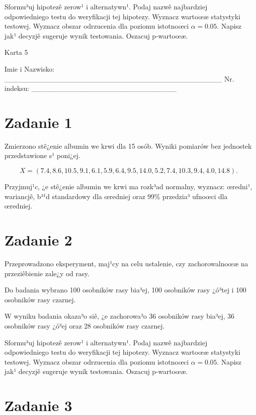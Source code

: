 \documentclass[a4paper,12pt]{article}
\begin{document}
     Sformu³uj hipotezê zerow¹ i alternatywn¹. 
     Podaj nazwê najbardziej odpowiedniego testu do weryfikacji tej hipotezy. 
     Wyznacz wartoœæ statystyki testowej. 
     Wyznacz obszar odrzucenia dla poziomu istotnoœci $\alpha=0.05$. 
     Napisz jak¹ decyzjê sugeruje wynik testowania. 
     Oszacuj p-wartoœæ. \vspace{1cm} 

  \clearpage  Karta  5  

 Imie i Nazwisko: \_\_\_\_\_\_\_\_\_\_\_\_\_\_\_\_\_\_\_\_\_\_\_\_\_\_\_\_\_\_\_\_\_\_\_\_\_\_\_\_\_\_ Nr. indeksu: \_\_\_\_\_\_\_\_\_\_\_\_\_\_\_\_\_\_\_\_\_\_\_\_\_\_\_\_ 
 \section*{Zadanie 1}
     
     Zmierzono stê¿enie albumin we krwi dla 15 osób. 
     Wyniki pomiarów bez jednostek przedstawione s¹ poni¿ej. 
     
     \noindent $$X=(  7.4,  8.6, 10.5,  9.1,  6.1,  5.9,  6.4,  9.5, 14.0,  5.2,  7.4, 10.3,  9.4,  4.0, 14.8 ).$$
     
     Przyjmuj¹c, ¿e stê¿enie albumin we krwi ma rozk³ad normalny, 
     wyznacz: œredni¹, wariancjê, b³¹d standardowy dla œredniej oraz 99\% przedzia³ ufnoœci dla œredniej. \vspace{1cm} 

  \section*{Zadanie 2}
     
  Przeprowadzono eksperyment, maj¹cy na celu ustalenie, czy zachorowalnoœæ na przeziêbienie zale¿y od rasy.
  
  Do badania wybrano 100 osobników rasy bia³ej, 100 osobników rasy ¿ó³tej i 100 osobników rasy czarnej. 
  
  W wyniku badania okaza³o siê, ¿e zachorowa³o 36 osobników rasy bia³ej, 36 osobników rasy ¿ó³ej oraz 28 osobników rasy czarnej. 
  
  Sformu³uj hipotezê zerow¹ i alternatywn¹. 
  Podaj nazwê najbardziej odpowiedniego testu do weryfikacji tej hipotezy. 
  Wyznacz wartoœæ statystyki testowej. 
  Wyznacz obszar odrzucenia dla poziomu istotnoœci $\alpha=0.05$. 
  Napisz jak¹ decyzjê sugeruje wynik testowania. Oszacuj p-wartoœæ. \vspace{1cm} 

  \section*{Zadanie 3}
     
\end{document}

